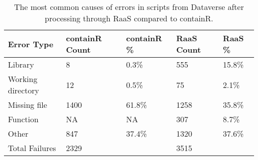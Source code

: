 \begin{table}
\centering
\caption{The most common causes of errors in scripts from Dataverse after processing through RaaS compared to containR.}
\label{tab:raas-error-data}
\begin{tabular}{lllll}
\toprule
       Error Type & containR Count & containR \% & RaaS Count & RaaS \% \\
\midrule
          Library &              8 &       0.3\% &        555 &  15.8\% \\ \hline
Working directory &             12 &       0.5\% &         75 &   2.1\% \\ \hline
     Missing file &           1400 &      61.8\% &       1258 &  35.8\% \\ \hline
         Function &             NA &         NA &        307 &   8.7\% \\ \hline
            Other &            847 &      37.4\% &       1320 &  37.6\% \\ \hline
   Total Failures &           2329 &            &       3515 &        \\
\bottomrule
\end{tabular}
\end{table}
